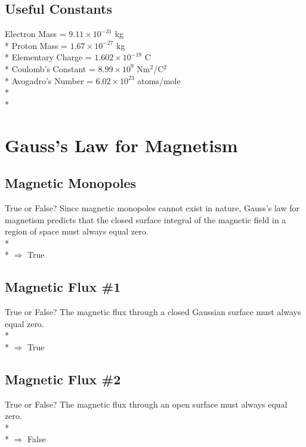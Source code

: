 \documentclass[11pt]{article}
\begin{document}
\maketitle
\tableofcontents
\vspace{50pt}

\subsection*{Useful Constants}
Electron Mass = $9.11 \times 10^{-31}$ kg \\*
Proton Mass = $1.67 \times 10^{-27}$ kg \\*
Elementary Charge = $1.602 \times 10^{-19}$ C \\*
Coulomb's Constant = $8.99 \times 10^9$ Nm$^2$/C$^2$ \\*
Avogadro's Number = $ 6.02 \times 10^{23}$ atoms/mole \\*\\*


\pagebreak
\section{Gauss's Law for Magnetism}
\vspace{10pt}

\subsection{Magnetic Monopoles}
True or False?  Since magnetic monopoles cannot exist in nature, Gauss's law for magnetism predicts that the closed surface integral of the magnetic field in a region of space must always equal zero.\\* \\*
$\Rightarrow$ True

\subsection{Magnetic Flux \#1}
True or False?  The magnetic flux through a closed Gaussian surface must always equal zero.\\* \\*
$\Rightarrow$ True

\subsection{Magnetic Flux \#2}
True or False?  The magnetic flux through an open surface must always equal zero.\\* \\*
$\Rightarrow$ False
\end{document}
